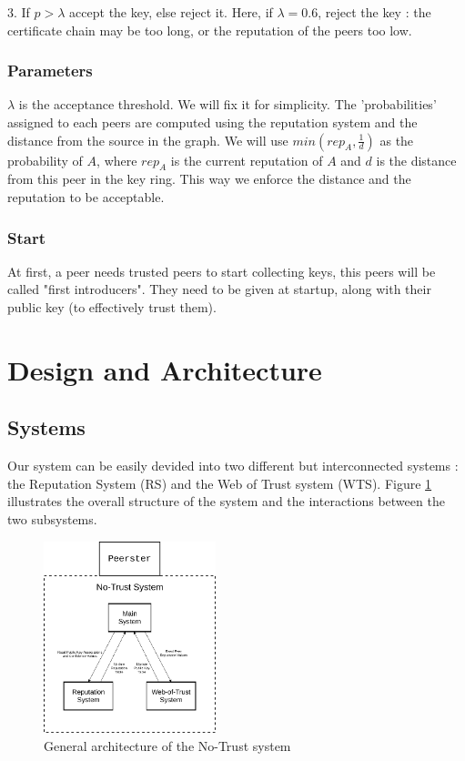 \documentclass[]{article}
\begin{document}
3. If $p > \lambda$ accept the key, else reject it. \newline
Here, if $\lambda = 0.6$, reject the key : the certificate chain may be too long, or the reputation of the peers too low.

\subsubsection{Parameters}
\label{sec:parameters}
$\lambda$ is the acceptance threshold. We will fix it for simplicity. \newline
The 'probabilities' assigned to each peers are computed using the reputation system and the distance from the source in the graph. We will use $min(rep_A, \frac{1}{d})$ as the probability of $A$, where $rep_A$ is the current reputation of $A$ and $d$ is the distance from this peer in the key ring. This way we enforce the distance and the reputation to be acceptable.

\subsubsection{Start}
At first, a peer needs trusted peers to start collecting keys, this peers will be called "first introducers". They need to be given at startup, along with their public key (to effectively trust them).

\section{Design and Architecture}

\subsection{Systems}
Our system can be easily devided into two different but interconnected systems : the Reputation System (RS) and the Web of Trust system (WTS). \newline
Figure \ref{fig:no-trust-arch} illustrates the overall structure of the system and the interactions between the two subsystems.

\begin{figure}[h]
	\includegraphics[width=50mm]{no-trust-arch}
	\centering
	\caption{General architecture of the No-Trust system}
	\label{fig:no-trust-arch}
\end{figure}
\end{document}
